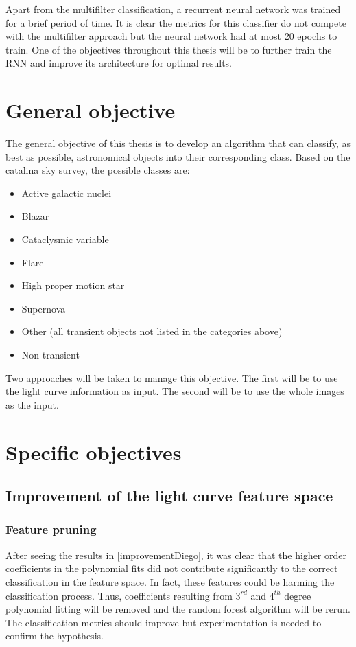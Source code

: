 Apart from the multifilter classification, a recurrent neural network was trained for a brief period of time. It is clear the metrics for this classifier do not compete with the multifilter approach but the neural network had at most 20 epochs to train. One of the objectives throughout this thesis will be to further train the RNN and improve its architecture for optimal results.


\section{General objective}

The general objective of this thesis is to develop an algorithm that can classify, as best as possible, astronomical objects into their corresponding class. Based on the catalina sky survey, the possible classes are:

\begin{itemize}
  \item Active galactic nuclei
  \item Blazar
  \item Cataclysmic variable
  \item Flare 
  \item High proper motion star
  \item Supernova 
  \item Other (all transient objects not listed in the categories above)
  \item Non-transient
\end{itemize}

Two approaches will be taken to manage this objective. The first will be to use the light curve information as input. The second will be to use the whole images as the input.

\section{Specific objectives}

\subsection{Improvement of the light curve feature space}

\subsubsection{Feature pruning}

After seeing the results in \ref{improvementDiego}, it was clear that the higher order coefficients in the polynomial fits did not contribute significantly to the correct classification in the feature space. In fact, these features could be harming the classification process. Thus, coefficients resulting from $3^{rd}$ and $4^{th}$ degree polynomial fitting will be removed and the random forest algorithm will be rerun. The classification metrics should improve but experimentation is needed to confirm the hypothesis.  

